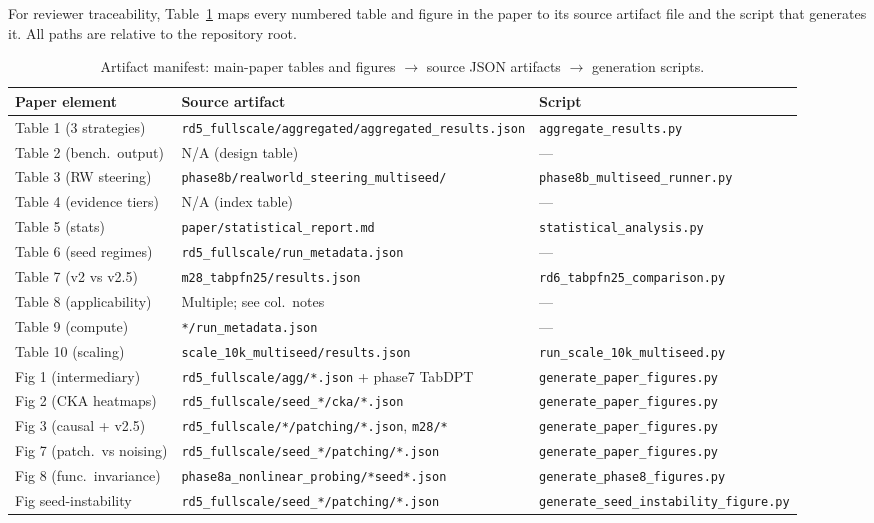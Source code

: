 \documentclass{article}
\begin{document}
For reviewer traceability, Table~\ref{tab:artifact-manifest} maps every numbered table and figure in the paper to its source artifact file and the script that generates it. All paths are relative to the repository root.

\begin{table}[htbp]
\centering
\caption{Artifact manifest: main-paper tables and figures $\to$ source JSON artifacts $\to$ generation scripts.}
\label{tab:artifact-manifest}
\scriptsize
\setlength{\tabcolsep}{3pt}
\begin{tabular}{@{}p{2.8cm} p{5.5cm} p{4.0cm}@{}}
\toprule
Paper element & Source artifact & Script \\
\midrule
Table 1 (3 strategies) & \texttt{rd5\_fullscale/aggregated/aggregated\_results.json} & \texttt{aggregate\_results.py} \\
Table 2 (bench.\ output) & N/A (design table) & --- \\
Table 3 (RW steering) & \texttt{phase8b/realworld\_steering\_multiseed/} & \texttt{phase8b\_multiseed\_runner.py} \\
Table 4 (evidence tiers) & N/A (index table) & --- \\
Table 5 (stats) & \texttt{paper/statistical\_report.md} & \texttt{statistical\_analysis.py} \\
Table 6 (seed regimes) & \texttt{rd5\_fullscale/run\_metadata.json} & --- \\
Table 7 (v2 vs v2.5) & \texttt{m28\_tabpfn25/results.json} & \texttt{rd6\_tabpfn25\_comparison.py} \\
Table 8 (applicability) & Multiple; see col.\ notes & --- \\
Table 9 (compute) & \texttt{*/run\_metadata.json} & --- \\
Table 10 (scaling) & \texttt{scale\_10k\_multiseed/results.json} & \texttt{run\_scale\_10k\_multiseed.py} \\
Fig 1 (intermediary) & \texttt{rd5\_fullscale/agg/*.json} + phase7 TabDPT & \texttt{generate\_paper\_figures.py} \\
Fig 2 (CKA heatmaps) & \texttt{rd5\_fullscale/seed\_*/cka/*.json} & \texttt{generate\_paper\_figures.py} \\
Fig 3 (causal + v2.5) & \texttt{rd5\_fullscale/*/patching/*.json}, \texttt{m28/*} & \texttt{generate\_paper\_figures.py} \\
Fig 7 (patch.\ vs noising) & \texttt{rd5\_fullscale/seed\_*/patching/*.json} & \texttt{generate\_paper\_figures.py} \\
Fig 8 (func.\ invariance) & \texttt{phase8a\_nonlinear\_probing/*seed*.json} & \texttt{generate\_phase8\_figures.py} \\
Fig seed-instability & \texttt{rd5\_fullscale/seed\_*/patching/*.json} & \texttt{generate\_seed\_instability\_figure.py} \\
\bottomrule
\end{tabular}
\end{table}
\end{document}
